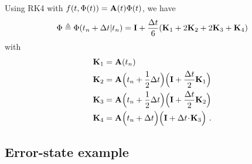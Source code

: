 Using RK4 with $f(t,\Phi(t))={\bf A}(t)\Phi(t)$, we have
%
\begin{equation}
\Phi\triangleq\Phi(t_n+\Delta t|t_n) = {\bf I} + \frac{\Delta t}{6}({\bf K}_1+2{\bf K}_2+2{\bf K}_3+{\bf K}_4)
\end{equation}
%
with
%
%
\begin{align}
{\bf K}_1 &= {\bf A}(t_n) \\
{\bf K}_2 &= {\bf A}\Big(t_n + \frac{1}{2}\Delta t \Big)\Big({\bf I} + \frac{\Delta t}{2} {\bf K}_1 \Big)\\
{\bf K}_3 &= {\bf A}\Big(t_n + \frac{1}{2}\Delta t \Big)\Big( {\bf I} + \frac{\Delta t}{2} {\bf K}_2\Big) \\
{\bf K}_4 &= {\bf A}\Big(t_n + \Delta t \Big)\Big( {\bf I} + \Delta t \!\cdot\! {\bf K}_3\Big) ~.
\end{align}%

\subsection{Error-state example}

